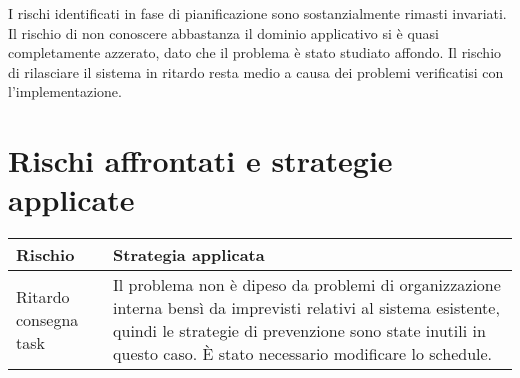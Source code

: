 I rischi identificati in fase di pianificazione sono sostanzialmente rimasti invariati. Il rischio di non conoscere abbastanza il dominio applicativo si è quasi completamente azzerato, dato che il problema è stato studiato affondo. Il rischio di rilasciare il sistema in ritardo resta medio a causa dei problemi verificatisi con l'implementazione.

\section{Rischi affrontati e strategie applicate}
\begin{table}[ht]
 \centering
 \begin{tabular}{|p{4cm}|p{9cm}|}
  \hline
  \rowcolor{Gray}\textbf{Rischio}			& \textbf{Strategia applicata}\\
  \hline
  Ritardo consegna task					& Il problema non è dipeso da problemi di organizzazione interna bensì da imprevisti relativi al sistema esistente, quindi le strategie di prevenzione sono state inutili in questo caso. È stato necessario modificare lo schedule.\\
  \hline
 \end{tabular}
\end{table}
